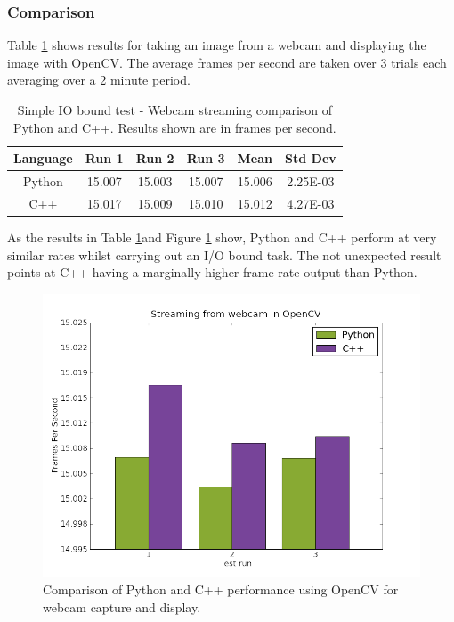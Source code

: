 \documentclass[english]{IEEEtran}
\providecommand{\tabularnewline}{\\}
\theoremstyle{plain}
\begin{document}
\subsubsection{Comparison}

Table \ref{tab:IO-bound-Webcam} shows results for taking an image
from a webcam and displaying the image with OpenCV. The average frames
per second are taken over 3 trials each averaging over a 2 minute period.

%
\begin{table}
\caption{\label{tab:IO-bound-Webcam}Simple IO bound test - Webcam streaming
comparison of Python and C++. Results shown are in frames per second.}


\begin{centering}
\begin{tabular}{|c|c|c|c|c|c|}
\hline 
Language & Run 1 & Run 2 & Run 3 & Mean & Std Dev\tabularnewline
\hline
\hline 
Python & 15.007 & 15.003 & 15.007 & 15.006  & 2.25E-03 \tabularnewline
\hline 
C++ & 15.017 & 15.009 & 15.010 & 15.012  & 4.27E-03 \tabularnewline
\hline
\end{tabular}
\par\end{centering}


\end{table}


As the results in Table \ref{tab:IO-bound-Webcam}and Figure \ref{fig:Streaming-comparison}
show, Python and C++ perform at very similar rates whilst carrying
out an I/O bound task. The not unexpected result points at C++ having
a marginally higher frame rate output than Python. 

%
\begin{figure}[h]
\centering{}\includegraphics[width=0.8\columnwidth]{report_data/streaming_from_webcam_in_opencv}\caption{\label{fig:Streaming-comparison}Comparison of Python and C++ performance
using OpenCV for webcam capture and display.}

\end{figure}
\end{document}
